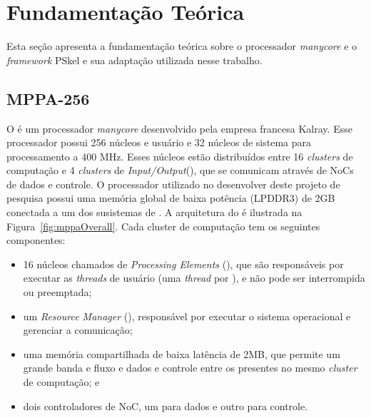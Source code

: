\chapter[Fundamentação Teórica]{Fundamentação Teórica}

Esta seção apresenta a fundamentação teórica sobre o processador \textit{manycore} \mppa e o \textit{framework} PSkel e sua adaptação utilizada nesse trabalho.

\section{MPPA-256}
\label{subsec:mppa}

O \mppa é um processador \textit{manycore} desenvolvido pela empresa francesa
Kalray. Esse processador possui 256 núcleos e usuário e 32 núcleos de sistema para processamento a 400 MHz. Esses núcleos estão distribuídos entre 16 \textit{clusters} de computação e 4 \textit{clusters} de \textit{Input/Output}(\io), que se comunicam através de NoCs de dados e controle. O processador utilizado no desenvolver deste projeto de pesquisa possui uma memória global de baixa potência (LPDDR3) de 2GB conectada a um dos susistemas de \io. A arquitetura do \mppa é ilustrada na Figura~\ref{fig:mppaOverall}. Cada cluster de computação tem os seguintes componentes:

\begin{itemize}
    \item 16 núcleos chamados de \textit{Processing Elements} (\pes), que são responsáveis por executar as \textit{threads} de usuário (uma \textit{thread} por \pe), e não pode ser interrompida ou preemptada;
    
    \item um \textit{Resource Manager} (\rman), responsável por executar o sistema operacional e gerenciar a comunicação;
    
    \item uma memória compartilhada de baixa latência de 2MB, que permite um grande banda e fluxo e dados e controle entre os \pes presentes no mesmo \textit{cluster} de computação; e
    
    \item dois controladores de NoC, um para dados e outro para controle.
    
\end{itemize}



